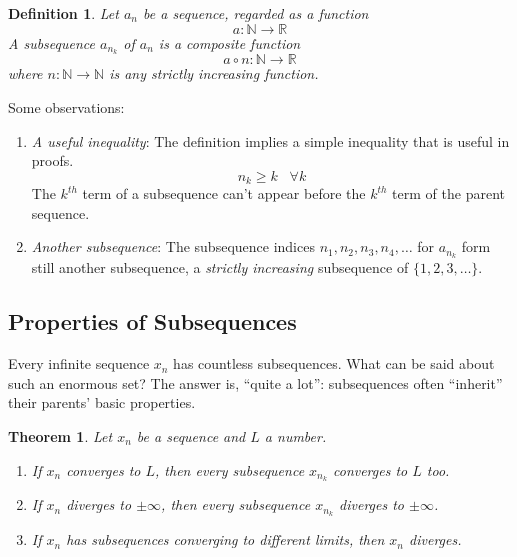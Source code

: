 \documentclass[12pt]{scrbook}
\newtheorem*{definition}{Definition}
\newtheorem{theorem}{Theorem}[section]
\begin{document}
\begin{definition}
Let $a_n$ be a sequence, regarded as a function 
\[ a: \mathbb{N} \rightarrow \mathbb{R} \]
A {\em subsequence} $a_{n_k}$ of $a_n$ is a composite function 
\[ a \circ n : \mathbb{N} \rightarrow \mathbb{R} \]
where $n: \mathbb{N} \rightarrow \mathbb{N}$ is any {\em strictly increasing} function.
\end{definition}

Some observations:
\begin{enumerate}
\item {\em A useful inequality}: The definition implies a simple inequality that is useful in proofs.
\[ n_k \ge k \;\;\; \forall k \]
The $k^{th}$ term of a subsequence can't appear before the $k^{th}$ term of the parent sequence.

\item {\em Another subsequence}: The subsequence indices $n_1, n_2, n_3, n_4, \ldots$ for $a_{n_k}$ form still another subsequence, a {\em strictly increasing} subsequence of $\{1, 2, 3, \ldots \}$.
\end{enumerate}

\subsection{Properties of Subsequences}
Every infinite sequence $x_n$ has countless subsequences.  What can be said about such an enormous set?  The answer is,
``quite a lot'': subsequences often ``inherit'' their parents' basic properties.

\begin{theorem} 
Let $x_n$ be a sequence and $L$ a number.
\begin{enumerate}

\item If $x_n$ converges to $L$, then every subsequence $x_{n_k}$ converges to $L$ too.

\item If $x_n$ diverges to $\pm \infty$, then every subsequence $x_{n_k}$ diverges to $\pm \infty$.

\item If $x_n$ has subsequences converging to different limits, then $x_n$ diverges.

\end{enumerate}
\end{theorem}
\end{document}
